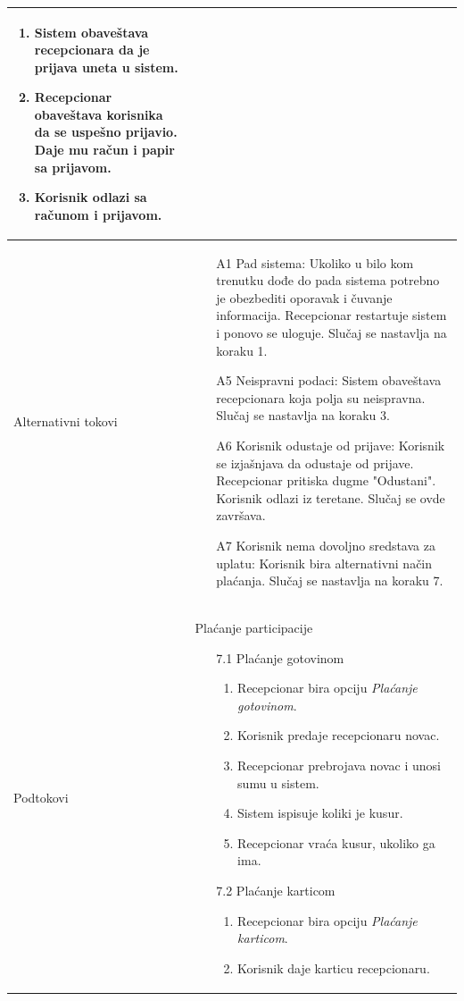 \documentclass[../../main.tex]{subfiles}
\begin{document}
\begin{longtable}{| p{} | p{} |}
\begin{enumerate}
        \item Sistem obaveštava recepcionara da je prijava uneta u sistem.
        \item Recepcionar obaveštava korisnika da se uspešno prijavio. Daje mu račun i papir sa prijavom.
        \item Korisnik odlazi sa računom i prijavom.
    \end{enumerate}\\
\hline
    Alternativni tokovi & \begin{itemize}
        \item[A1] Pad sistema: Ukoliko u bilo kom trenutku dođe do pada sistema potrebno je obezbediti oporavak i čuvanje informacija. Recepcionar restartuje sistem i ponovo se uloguje. Slučaj se nastavlja na koraku 1.
        \item[A5] Neispravni podaci: Sistem obaveštava recepcionara koja polja su neispravna. Slučaj se nastavlja na koraku 3.
        \item[A6] Korisnik odustaje od prijave: Korisnik se izjašnjava da odustaje od prijave. Recepcionar pritiska dugme "Odustani". Korisnik odlazi iz teretane. Slučaj se ovde završava.
        \item[A7] Korisnik nema dovoljno sredstava za uplatu: Korisnik bira alternativni način plaćanja. Slučaj se nastavlja na koraku 7.
    \end{itemize}\\
\hline
    Podtokovi & Plaćanje participacije\begin{itemize}
        \item[7.1] Plaćanje gotovinom \begin{enumerate}
            \item Recepcionar bira opciju \textit{Plaćanje gotovinom}.
            \item Korisnik predaje recepcionaru novac.
            \item Recepcionar prebrojava novac i unosi sumu u sistem.
            \item Sistem ispisuje koliki je kusur.
            \item Recepcionar vraća kusur, ukoliko ga ima.
        \end{enumerate} 
        \item[7.2] Plaćanje karticom \begin{enumerate}
            \item Recepcionar bira opciju \textit{Plaćanje karticom}.
            \item Korisnik daje karticu recepcionaru.

\end{enumerate}
\end{itemize}
\end{longtable}
\end{document}
